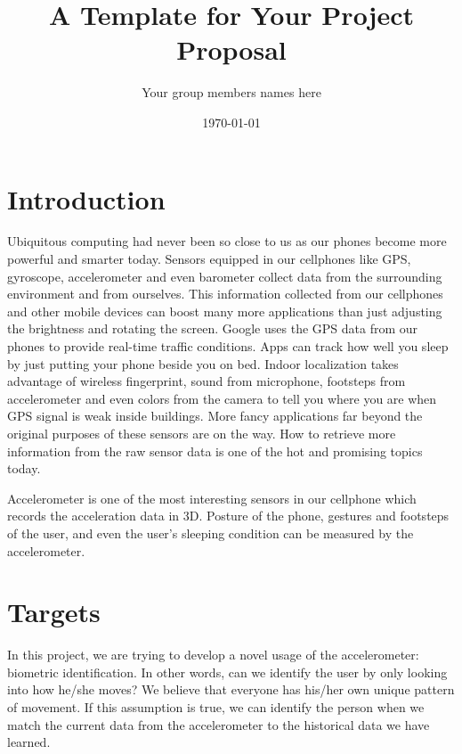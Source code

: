 \documentclass[12pt]{article}
\begin{document}

\title{A Template for Your Project Proposal}
\author{Your group members names here}
\date{\today}



\maketitle


\section{Introduction}

Ubiquitous computing had never been so close to us as our phones become more powerful and smarter today. Sensors equipped in our cellphones like GPS, gyroscope, accelerometer and even barometer collect data from the surrounding environment and from ourselves. This information collected from our cellphones and other mobile devices can boost many more applications than just adjusting the brightness and rotating the screen. Google uses the GPS data from our phones to provide real-time traffic conditions. Apps can track how well you sleep by just putting your phone beside you on bed. Indoor localization takes advantage of wireless fingerprint, sound from microphone, footsteps from accelerometer and even colors from the camera to tell you where you are when GPS signal is weak inside buildings. More fancy applications far beyond the original purposes of these sensors are on the way. How to retrieve more information from the raw sensor data is one of the hot and promising topics today.

Accelerometer is one of the most interesting sensors in our cellphone which records the acceleration data in 3D. Posture of the phone, gestures and footsteps of the user, and even the user's sleeping condition can be measured by the accelerometer. 


\section{Targets}

In this project, we are trying to develop a novel usage of the accelerometer: biometric identification. In other words, can we identify the user by only looking into how he/she moves? We believe that everyone has his/her own unique pattern of movement. If this assumption is true, we can identify the person when we match the current data from the accelerometer to the historical data we have learned. 
\end{document}
